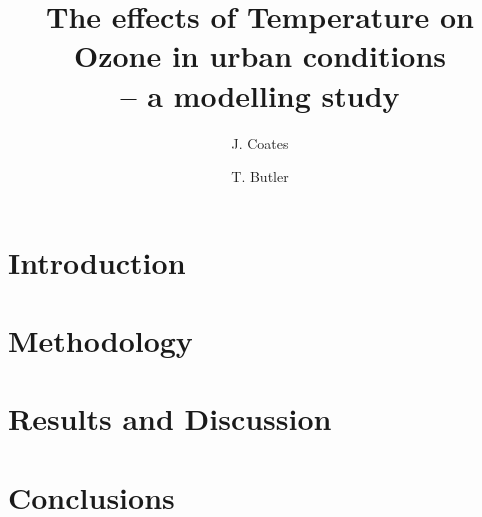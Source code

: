 \documentclass[11pt,a4paper]{article}
\title{The effects of Temperature on Ozone in urban conditions \\-- a modelling study}
\author[1]{J. Coates}
\author[1]{T. Butler}
\affil[1]{Institute for Advanced Sustainability Studies, Potsdam, Germany}
\begin{document}
\maketitle

\begin{abstract}
\end{abstract}

\section{Introduction} \label{s:introduction}


\section{Methodology} \label{s:methodology}


\section{Results and Discussion} \label{s:results}


\section{Conclusions} \label{s:conclusions}
%


 
\end{document}
